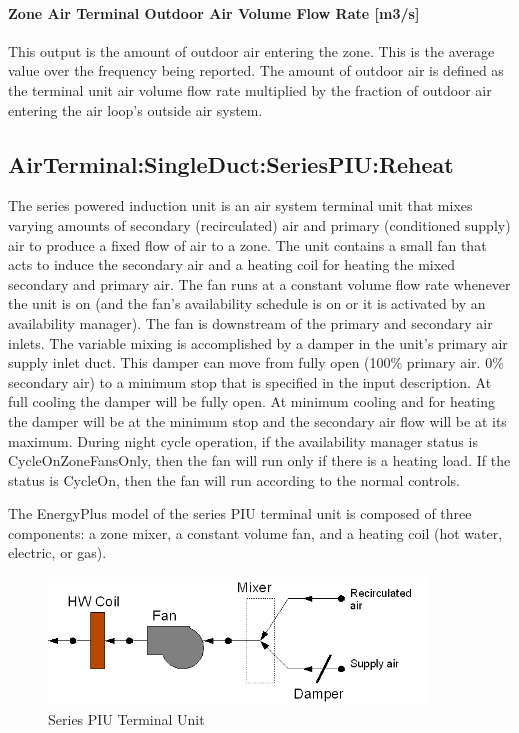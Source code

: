 \paragraph{Zone Air Terminal Outdoor Air Volume Flow Rate {[}m3/s{]}}

This output is the amount of outdoor air entering the zone. This is the average value over the frequency being reported. The amount of outdoor air is defined as the terminal unit air volume flow rate multiplied by the fraction of outdoor air entering the air loop's outside air system.

\subsection{AirTerminal:SingleDuct:SeriesPIU:Reheat}\label{airterminalsingleductseriespiureheat}

The series powered induction unit is an air system terminal unit that mixes varying amounts of secondary (recirculated) air and primary (conditioned supply) air to produce a fixed flow of air to a zone. The unit contains a small fan that acts to induce the secondary air and a heating coil for heating the mixed secondary and primary air. The fan runs at a constant volume flow rate whenever the unit is on (and the fan's availability schedule is on or it is activated by an availability manager). The fan is downstream of the primary and secondary air inlets. The variable mixing is accomplished by a damper in the unit's primary air supply inlet duct. This damper can move from fully open (100\% primary air. 0\% secondary air) to a minimum stop that is specified in the input description. At full cooling the damper will be fully open. At minimum cooling and for heating the damper will be at the minimum stop and the secondary air flow will be at its maximum. During night cycle operation, if the availability manager status is CycleOnZoneFansOnly, then the fan will run only if there is a heating load.  If the status is CycleOn, then the fan will run according to the normal controls.


The EnergyPlus model of the series PIU terminal unit is composed of three components: a zone mixer, a constant volume fan, and a heating coil (hot water, electric, or gas).

\begin{figure}[hbtp] %
\centering
\includegraphics[width=0.9\textwidth, height=0.9\textheight, keepaspectratio=true]{media/image269.png}
\caption{Series PIU Terminal Unit \protect \label{fig:series-piu-terminal-unit}}
\end{figure}

